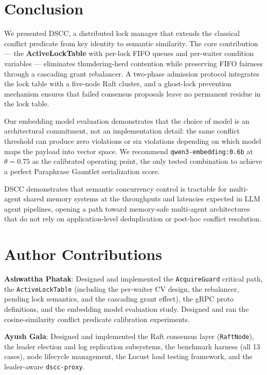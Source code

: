 \documentclass[sigconf]{acmart}
\begin{document}
\section{Conclusion}
\label{sec:conclusion}

We presented DSCC, a distributed lock manager that extends the classical conflict
predicate from key identity to semantic similarity. The core contribution — the
\textbf{ActiveLockTable} with per-lock FIFO queues and per-waiter condition variables —
eliminates thundering-herd contention while preserving FIFO fairness through a cascading
grant rebalancer. A two-phase admission protocol integrates the lock table with a
five-node Raft cluster, and a ghost-lock prevention mechanism ensures that failed
consensus proposals leave no permanent residue in the lock table.

Our embedding model evaluation demonstrates that the choice of model is an architectural
commitment, not an implementation detail: the same conflict threshold can produce zero
violations or six violations depending on which model maps the payload into vector space.
We recommend \texttt{qwen3-embedding:0.6b} at $\theta{=}0.75$ as the calibrated
operating point, the only tested combination to achieve a perfect Paraphrase Gauntlet
serialization score.

DSCC demonstrates that semantic concurrency control is tractable for multi-agent shared
memory systems at the throughputs and latencies expected in LLM agent pipelines, opening
a path toward memory-safe multi-agent architectures that do not rely on application-level
deduplication or post-hoc conflict resolution.

\section*{Author Contributions}

\textbf{Ashwattha Phatak}: Designed and implemented the \texttt{Acquire\-Guard} critical
path, the \texttt{Active\-Lock\-Table} (including the per-waiter CV design, the
rebalancer, pending lock semantics, and the cascading grant effect), the gRPC proto
definitions, and the embedding model evaluation study. Designed and ran the
cosine-similarity conflict predicate calibration experiments.

\textbf{Ayush Gala}: Designed and implemented the Raft consensus layer
(\texttt{RaftNode}), the leader election and log replication subsystems, the benchmark
harness (all 13 cases), node lifecycle management, the Locust load testing framework,
and the leader-aware \texttt{dscc-proxy}.
\end{document}
